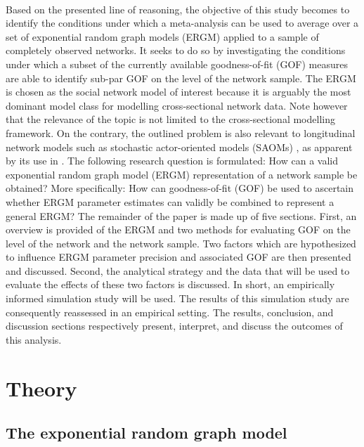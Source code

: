 \documentclass[a4paper, man, floatsintext]{apa6}
\begin{document}
\\ 
Based on the presented line of reasoning, the objective of this study becomes to identify the conditions under which a meta-analysis can be used to average over a set of exponential random graph models (ERGM) applied to a sample of completely observed networks. It seeks to do so by investigating the conditions under which a subset of the currently available goodness-of-fit (GOF) measures are able to identify sub-par GOF on the level of the network sample. The ERGM is chosen as the social network model of interest because it is arguably the most dominant model class for modelling cross-sectional network data. Note however that the relevance of the topic is not limited to the cross-sectional modelling framework. On the contrary, the outlined problem is also relevant to longitudinal network models such as stochastic actor-oriented models (SAOMs) \cite{snijders2001statistical}, as apparent by its use in . 
\clearpage 
The following research question is formulated: How can a valid exponential random graph model (ERGM) representation of a network sample be obtained? \noindent More specifically: How can goodness-of-fit (GOF) be used to ascertain whether ERGM parameter estimates can validly be combined to represent a general ERGM? The remainder of the paper is made up of five sections. First, an overview is provided of the ERGM and two methods for evaluating GOF on the level of the network and the network sample. Two factors which are hypothesized to influence ERGM parameter precision and associated GOF are then presented and discussed. Second, the analytical strategy and the data that will be used to evaluate the effects of these two factors is discussed. In short, an empirically informed simulation study will be used. The results of this simulation study are consequently reassessed in an empirical setting. The results, conclusion, and discussion sections respectively present, interpret, and discuss the outcomes of this analysis.

\section{Theory}
\subsection{The exponential random graph model}
\end{document}
